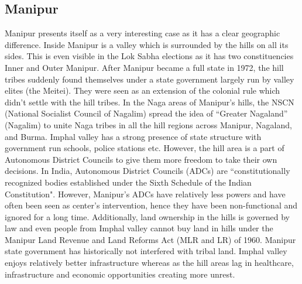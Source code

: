 \subsection{Manipur}

Manipur presents itself as a very interesting case as it has a clear geographic difference. Inside Manipur is a valley which is surrounded by the hills on all its sides. This is even visible in the Lok Sabha elections as it has two constituencies Inner and Outer Manipur. After Manipur became a full state in 1972, the hill tribes suddenly found themselves under a state government largely run by valley elites (the Meitei). They were seen as an extension of the colonial rule which didn't settle with the hill tribes.  In the Naga areas of Manipur's hills, the NSCN (National Socialist Council of Nagalim) spread the idea of ``Greater Nagaland” (Nagalim) to unite Naga tribes in all the hill regions across Manipur, Nagaland, and Burma. Imphal valley has a strong presence of state structure with government run schools, police stations etc. However, the hill area is a part of Autonomous District Councils to give them more freedom to take their own decisions. In India, Autonomous District Councils (ADCs) are ``constitutionally recognized bodies established under the Sixth Schedule of the Indian Constitution". However, Manipur’s ADCs have relatively less powers and have often been seen as center's intervention, hence they have been non-functional and ignored for a long time. Additionally, land ownership in the hills is governed by law and even people from Imphal valley cannot buy land in hills under the  Manipur Land Revenue and Land Reforms Act (MLR and LR) of 1960. Manipur state government has historically not interfered with tribal land. 
Imphal valley enjoys relatively better infrastructure whereas as the hill areas lag in healthcare, infrastructure and economic opportunities creating more unrest. \citep{lacina2009problem}

